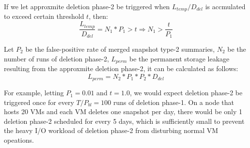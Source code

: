 If we let approxmite deletion phase-2 be triggered  
when $L_{temp}/D_{del}$ is accmulated to exceed certain threshold $t$, then:
\begin{equation}
\frac{L_{temp}}{D_{del}} = N_1 * P_1 > t \Rightarrow N_{1} > \frac{t}{P_1}
\end{equation}

Let $P_2$ be the false-positive rate of merged snapshot type-2 summaries,
$N_2$ be the number of runs of deletion phase-2,
$L_{perm}$ be the permanent storage leakage resulting from the approxmite deletion phase-2,
it can be calculated as follows: 
\begin{equation}
L_{perm} = N_2 * P_1 * P_2 * D_{del}
\end{equation}

For example, letting $P_1 = 0.01$ and $t=1.0$, 
we would expect deletion phase-2 be triggered once for 
every $T/P_{bl} = 100$ runs of deletion phase-1.
On a node that hosts 20 VMs and each VM deletes one snapshot per day, there would be 
only 1 deletion phase-2 scheduled for every 5 days, which is sufficiently small to prevent the 
heavy I/O workload of deletion phase-2 from disturbing normal VM opeations.

